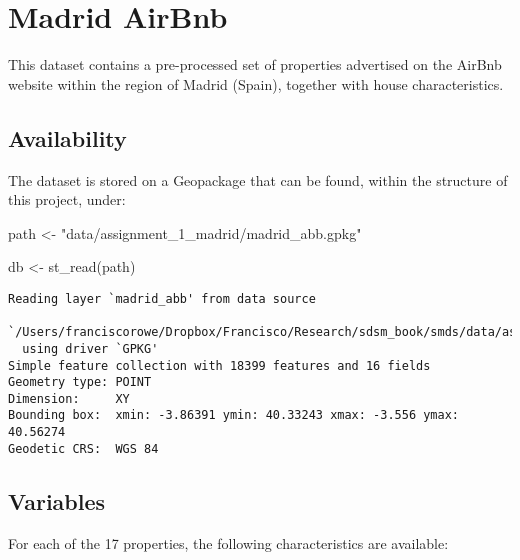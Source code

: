 \documentclass[
  letterpaper,
  krantz2]{style/krantz}
\newenvironment{Shaded}{\begin{snugshade}}{\end{snugshade}}
\newcommand{\FunctionTok}[1]{\textcolor[rgb]{0.28,0.35,0.67}{#1}}
\newcommand{\NormalTok}[1]{\textcolor[rgb]{0.00,0.23,0.31}{#1}}
\newcommand{\OtherTok}[1]{\textcolor[rgb]{0.00,0.23,0.31}{#1}}
\newcommand{\StringTok}[1]{\textcolor[rgb]{0.13,0.47,0.30}{#1}}
\begin{document}
\hypertarget{madrid-airbnb}{%
\section{Madrid AirBnb}\label{madrid-airbnb}}

This dataset contains a pre-processed set of properties advertised on
the AirBnb website within the region of Madrid (Spain), together with
house characteristics.

\hypertarget{availability}{%
\subsection*{Availability}\label{availability}}

The dataset is stored on a Geopackage that can be found, within the
structure of this project, under:

\begin{Shaded}
\begin{Highlighting}[]
\NormalTok{path }\OtherTok{\textless{}{-}} \StringTok{"data/assignment\_1\_madrid/madrid\_abb.gpkg"}
\end{Highlighting}
\end{Shaded}

\begin{Shaded}
\begin{Highlighting}[]
\NormalTok{db }\OtherTok{\textless{}{-}} \FunctionTok{st\_read}\NormalTok{(path)}
\end{Highlighting}
\end{Shaded}

\begin{verbatim}
Reading layer `madrid_abb' from data source 
  `/Users/franciscorowe/Dropbox/Francisco/Research/sdsm_book/smds/data/assignment_1_madrid/madrid_abb.gpkg' 
  using driver `GPKG'
Simple feature collection with 18399 features and 16 fields
Geometry type: POINT
Dimension:     XY
Bounding box:  xmin: -3.86391 ymin: 40.33243 xmax: -3.556 ymax: 40.56274
Geodetic CRS:  WGS 84
\end{verbatim}

\hypertarget{variables}{%
\subsection*{Variables}\label{variables}}

For each of the 17 properties, the following characteristics are
available:
\end{document}
